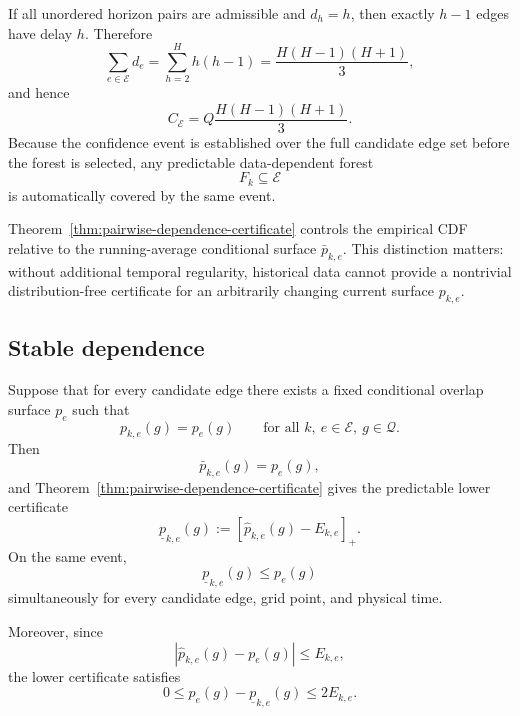 \documentclass[11pt]{article}
\begin{document}
If all unordered horizon pairs are admissible and $d_h=h$, then exactly
$h-1$ edges have delay $h$.  Therefore
\begin{equation}
    \sum_{e\in\mathcal E}d_e
    =
    \sum_{h=2}^{H}h(h-1)
    =
    \frac{H(H-1)(H+1)}{3},
\end{equation}
and hence
\begin{equation}
\boxed{
    C_{\mathcal E}
    =
    Q\frac{H(H-1)(H+1)}{3}.
}
\label{eq:complete-edge-complexity}
\end{equation}
Because the confidence event is established over the full candidate edge set
before the forest is selected, any predictable data-dependent forest
\[
    F_k\subseteq\mathcal E
\]
is automatically covered by the same event.

Theorem~\ref{thm:pairwise-dependence-certificate} controls the empirical CDF
relative to the running-average conditional surface $\bar p_{k,e}$.  This
distinction matters: without additional temporal regularity, historical data
cannot provide a nontrivial distribution-free certificate for an arbitrarily
changing current surface $p_{k,e}$.

\subsection{Stable dependence}

Suppose that for every candidate edge there exists a fixed conditional overlap
surface $p_e$ such that
\begin{equation}
    p_{k,e}(g)
    =
    p_e(g)
    \qquad
    \text{for all }
    k,\ e\in\mathcal E,\ g\in\mathcal Q.
    \label{eq:stable-edge-overlap}
\end{equation}
Then
\[
    \bar p_{k,e}(g)=p_e(g),
\]
and Theorem~\ref{thm:pairwise-dependence-certificate} gives the predictable
lower certificate
\begin{equation}
    \underline p_{k,e}(g)
    :=
    \left[
        \widehat p_{k,e}(g)-E_{k,e}
    \right]_+.
    \label{eq:stable-edge-lower-surface}
\end{equation}
On the same event,
\begin{equation}
\boxed{
    \underline p_{k,e}(g)
    \le
    p_e(g)
}
\end{equation}
simultaneously for every candidate edge, grid point, and physical time.

Moreover, since
\[
    \left|
        \widehat p_{k,e}(g)-p_e(g)
    \right|
    \le
    E_{k,e},
\]
the lower certificate satisfies
\begin{equation}
\boxed{
    0
    \le
    p_e(g)-\underline p_{k,e}(g)
    \le
    2E_{k,e}.
}
\label{eq:edge-credit-gap}
\end{equation}
\end{document}
